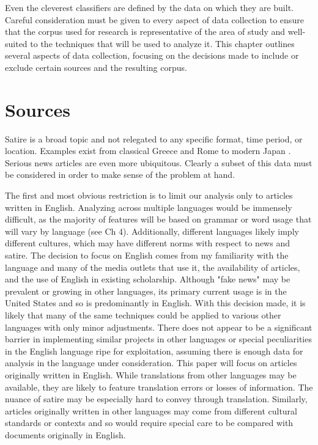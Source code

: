 \documentclass [12 pt] {report}
\begin{document}
Even the cleverest classifiers are defined by the data on which they are built. Careful consideration must be given to every aspect of data collection to ensure that the corpus used for research is representative of the area of study and well-suited to the techniques that will be used to analyze it. This chapter outlines several aspects of data collection, focusing on the decisions made to include or exclude certain sources and the resulting corpus.

\section{Sources}
Satire is a broad topic and not relegated to any specific format, time period, or location. Examples exist from classical Greece and Rome to modern Japan \cite{defSatire}. Serious news articles are even more ubiquitous. Clearly a subset of this data must be considered in order to make sense of the problem at hand.


The first and most obvious restriction is to limit our analysis only to articles written in English. Analyzing across multiple languages would be immensely difficult, as the majority of features will be based on grammar or word usage that will vary by language (see Ch 4). Additionally, different languages likely imply different cultures, which may have different norms with respect to news and satire. The decision to focus on English comes from my familiarity with the language and many of the media outlets that use it, the availability of articles, and the use of English in existing scholarship. Although "fake news" may be prevalent or growing in other languages, its primary current usage is in the United States and so is predominantly in English. With this decision made, it is likely that many of the same techniques could be applied to various other languages with only minor adjustments. There does not appear to be a significant barrier in implementing similar projects in other languages or special peculiarities in the English language ripe for exploitation, assuming there is enough data for analysis in the language under consideration. This paper will focus on articles originally written in English. While translations from other languages may be available, they are likely to feature translation errors or losses of information. The nuance of satire may be especially hard to convey through translation. Similarly, articles originally written in other languages may come from different cultural standards or contexts and so would require special care to be compared with documents originally in English.
\end{document}
